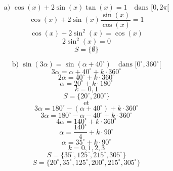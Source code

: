 \documentclass{article}
\begin{document}
\[ \text{a) } \cos(x) + 2 \sin(x) \tan(x) = 1 \quad \text{dans } [0, 2\pi[ \]
\[ \cos(x) + 2 \sin(x) \frac{\sin(x)}{\cos(x)} = 1 \]
\[ \cos(x) + 2 \sin^2(x) = \cos(x) \]
\[ 2 \sin^2(x) = 0 \]
\[ S = \{\emptyset\} \]

\[ \text{b) } \sin(3\alpha) = \sin(\alpha + 40^\circ) \quad \text{dans } [0^\circ, 360^\circ[ \]
\[ 3\alpha = \alpha + 40^\circ + k \cdot 360^\circ \]
\[ 2\alpha = 40^\circ + k \cdot 360^\circ \]
\[ \alpha = 20^\circ + k \cdot 180^\circ \]
\[ k = 0, 1 \]
\[ S = \{20^\circ, 200^\circ\} \]
\[ \text{et} \]
\[ 3\alpha = 180^\circ - (\alpha + 40^\circ) + k \cdot 360^\circ \]
\[ 3\alpha = 180^\circ - \alpha - 40^\circ + k \cdot 360^\circ \]
\[ 4\alpha = 140^\circ + k \cdot 360^\circ \]
\[ \alpha = \frac{140^\circ}{4} + k \cdot 90^\circ \]
\[ \alpha = 35^\circ + k \cdot 90^\circ \]
\[ k = 0, 1, 2, 3 \]
\[ S = \{35^\circ, 125^\circ, 215^\circ, 305^\circ\} \]
\[ S = \{20^\circ, 35^\circ, 125^\circ, 200^\circ, 215^\circ, 305^\circ\} \]
\end{document}
